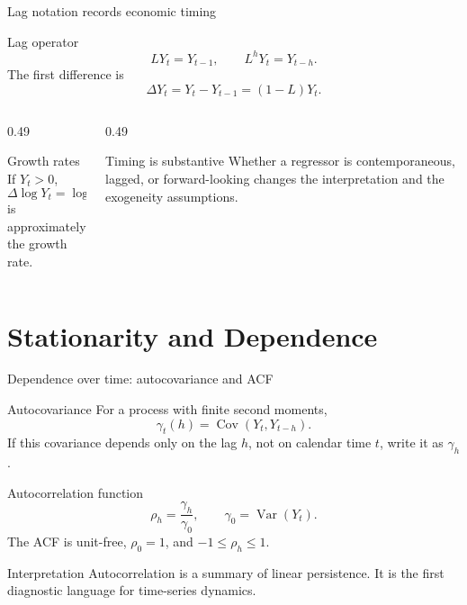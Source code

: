 \documentclass[10pt]{beamer}
\DeclareMathOperator{\Cov}{Cov}
\DeclareMathOperator{\Var}{Var}
\begin{document}
\begin{frame}{Lag notation records economic timing}
\label{slide:lag_notation}
\small
\begin{block}{Lag operator}
\[
LY_t=Y_{t-1},
\qquad
L^hY_t=Y_{t-h}.
\]
The first difference is
\[
\Delta Y_t=Y_t-Y_{t-1}=(1-L)Y_t.
\]
\end{block}

\begin{columns}[T]
\begin{column}{0.49\textwidth}
\begin{exampleblock}{Growth rates}
If $Y_t>0$,
\[
\Delta\log Y_t=\log Y_t-\log Y_{t-1}
\]
is approximately the growth rate.
\end{exampleblock}
\end{column}
\begin{column}{0.49\textwidth}
\begin{alertblock}{Timing is substantive}
Whether a regressor is contemporaneous, lagged, or forward-looking changes the interpretation and the exogeneity assumptions.
\end{alertblock}
\end{column}
\end{columns}
\end{frame}

\section{Stationarity and Dependence}

\begin{frame}{Dependence over time: autocovariance and ACF}
\label{slide:acf_def}
\small
\begin{block}{Autocovariance}
For a process with finite second moments,
\[
\gamma_t(h)=\Cov(Y_t,Y_{t-h}).
\]
If this covariance depends only on the lag $h$, not on calendar time $t$, write it as $\gamma_h$.
\end{block}

\pause
\begin{block}{Autocorrelation function}
\[
\rho_h=\frac{\gamma_h}{\gamma_0},
\qquad
\gamma_0=\Var(Y_t).
\]
The ACF is unit-free, $\rho_0=1$, and $-1\leq \rho_h\leq 1$.
\end{block}

\pause
\begin{alertblock}{Interpretation}
Autocorrelation is a summary of linear persistence. It is the first diagnostic language for time-series dynamics.
\end{alertblock}
\end{frame}
\end{document}
